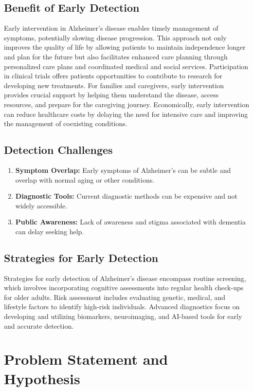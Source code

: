 \documentclass[a4paper,12pt]{report}
\begin{document}
    \subsection{Benefit of Early Detection}
Early intervention in Alzheimer's disease enables timely management of symptoms, potentially slowing disease progression. This approach not only improves the quality of life by allowing patients to maintain independence longer and plan for the future but also facilitates enhanced care planning through personalized care plans and coordinated medical and social services. Participation in clinical trials offers patients opportunities to contribute to research for developing new treatments. For families and caregivers, early intervention provides crucial support by helping them understand the disease, access resources, and prepare for the caregiving journey. Economically, early intervention can reduce healthcare costs by delaying the need for intensive care and improving the management of coexisting conditions.
    \subsection{Detection Challenges}
\begin{enumerate}
    \item\textbf{Symptom Overlap:} Early symptoms of Alzheimer's can be subtle and overlap with normal aging or other conditions.
    \item\textbf{Diagnostic Tools:} Current diagnostic methods can be expensive and not widely accessible.
    \item\textbf{Public Awareness:} Lack of awareness and stigma associated with dementia can delay seeking help.
 \end{enumerate}
    \subsection{Strategies for Early Detection}
Strategies for early detection of Alzheimer's disease encompass routine screening, which involves incorporating cognitive assessments into regular health check-ups for older adults. Risk assessment includes evaluating genetic, medical, and lifestyle factors to identify high-risk individuals. Advanced diagnostics focus on developing and utilizing biomarkers, neuroimaging, and AI-based tools for early and accurate detection.



\section{Problem Statement and Hypothesis}
\end{document}
